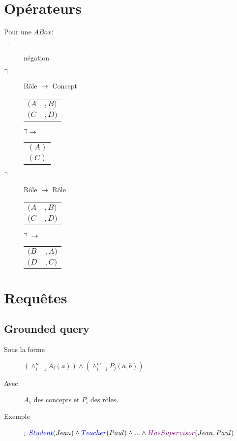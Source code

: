 \section{Opérateurs}
Pour une $ABox$:\\
\begin{description}
\item[$\neg$] négation
\item[$\exists$] Rôle $\rightarrow$ Concept\\
\begin{multicols}{3}
\begin{tabular}{ll}
$(A$ & $, B)$\\
$(C$ & $, D)$\\
\end{tabular}
$ \exists \rightarrow$
\begin{tabular}{l}
$(A)$\\
$(C)$\\
\end{tabular}
\end{multicols}

\item[$\urcorner\ $] Rôle $\rightarrow$ Rôle\\
\begin{multicols}{3}
\begin{tabular}{ll}
$(A$ & $, B)$\\
$(C$ & $, D)$\\
\end{tabular}
$ \urcorner\  \rightarrow$
\begin{tabular}{ll}
$(B$ & $, A)$\\
$(D$ & $, C)$\\
\end{tabular}
\end{multicols}
\end{description}

\section{Requêtes}
\subsection{Grounded query}
\begin{description}
\item[Sous la forme] $(\wedge_{i=1}^n A_i(a)) \wedge (\wedge_{i=1}^m P_j(a,b))$
\item[Avec] $A_1$ des concepts et $P_i$ des rôles.
\item[Exemple]: $\textcolor{blue}{Student}(Jean) \wedge \textcolor{blue}{Teacher}(Paul) \wedge ... \wedge \textcolor{violet}{HasSupervisor}(Jean, Paul)$
\end{description}
